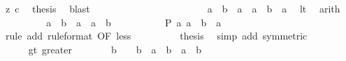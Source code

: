 \begin{isabellebody}
\ z\ c\ \isamarkupfalse%
\ {\isacharquery}{\kern0pt}thesis\ \isamarkupfalse%
\ blast\isanewline
\ \ \ \ \isamarkupfalse%
\isanewline
\ \ \ \ \ \ \isamarkupfalse%
\ {}\isanewline
\ \ \ \ \ \ \isamarkupfalse%
\ \isamarkupfalse%
\ {\isacharasterisk}{\kern0pt}{\isacharcolon}{\kern0pt}\ {\isachardoublequoteopen}a\ {\isacharplus}{\kern0pt}\ b\ {\isacharminus}{\kern0pt}\ a\ {\isacharequal}{\kern0pt}\ a\ {\isacharplus}{\kern0pt}\ {\isacharparenleft}{\kern0pt}b\ {\isacharminus}{\kern0pt}\ a{\isacharparenright}{\kern0pt}{\isachardoublequoteclose}\ \isamarkupfalse%
\ lt\ \isamarkupfalse%
\ arith\isanewline
\ \ \ \ \ \ \isamarkupfalse%
\ \isamarkupfalse%
\ {\isachardoublequoteopen}a\ {\isacharplus}{\kern0pt}\ {\isacharparenleft}{\kern0pt}b\ {\isacharminus}{\kern0pt}\ a{\isacharparenright}{\kern0pt}\ {\isacharless}{\kern0pt}\ a\ {\isacharplus}{\kern0pt}\ b{\isachardoublequoteclose}\ \isacommand{{\isachardot}{\kern0pt}}\isamarkupfalse%
\isanewline
\ \ \ \ \ \ \isamarkupfalse%
\ \isamarkupfalse%
\ {\isachardoublequoteopen}P\ a\ {\isacharparenleft}{\kern0pt}a\ {\isacharplus}{\kern0pt}\ {\isacharparenleft}{\kern0pt}b\ {\isacharminus}{\kern0pt}\ a{\isacharparenright}{\kern0pt}{\isacharparenright}{\kern0pt}{\isachardoublequoteclose}\ \isamarkupfalse%
\ {\isacharparenleft}{\kern0pt}rule\ add\ {\isacharbrackleft}{\kern0pt}rule{\isacharunderscore}{\kern0pt}format{\isacharcomma}{\kern0pt}\ OF\ less{\isacharbrackright}{\kern0pt}{\isacharparenright}{\kern0pt}\isanewline
\ \ \ \ \ \ \isamarkupfalse%
\ \isamarkupfalse%
\ {\isacharquery}{\kern0pt}thesis\ \isamarkupfalse%
\ {\isacharparenleft}{\kern0pt}simp\ add{\isacharcolon}{\kern0pt}\ {\isacharasterisk}{\kern0pt}{\isacharbrackleft}{\kern0pt}symmetric{\isacharbrackright}{\kern0pt}{\isacharparenright}{\kern0pt}\isanewline
\ \ \ \ \isamarkupfalse%
\isanewline
\ \ \isamarkupfalse%
\isanewline
\ \ \ \ \isamarkupfalse%
\ gt{\isacharcolon}{\kern0pt}\ greater\isanewline
\ \ \ \ \isamarkupfalse%
\ \isamarkupfalse%
\ {\isachardoublequoteopen}b\ {\isacharequal}{\kern0pt}\ {}{\isachardoublequoteclose}\ {\isacharbar}{\kern0pt}\ {\isachardoublequoteopen}b\ {\isacharplus}{\kern0pt}\ a\ {\isacharminus}{\kern0pt}\ b\ {\isacharless}{\kern0pt}\ a\ {\isacharplus}{\kern0pt}\ b{\isachardoublequoteclose}\ \isamarkupfalse%

\end{isabellebody}
